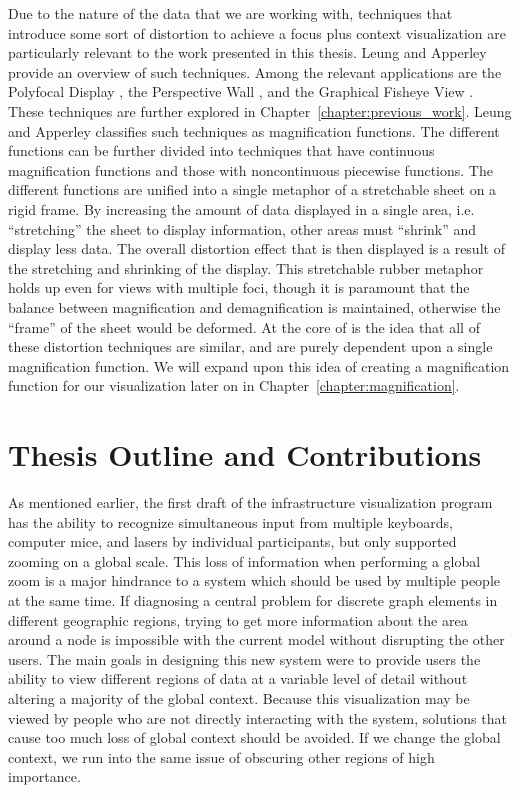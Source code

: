 Due to the nature of the data that we are working with, techniques that introduce some sort of distortion to achieve a focus plus context visualization are particularly relevant to the work presented in this thesis. Leung and Apperley provide an overview of such techniques\cite{Leung1994}. Among the relevant applications are the Polyfocal Display \cite{Kadmon1978}, the Perspective Wall \cite{Mackinlay1991}, and the Graphical Fisheye View \cite{Sarkar1992}. These techniques are further explored in
Chapter~\ref{chapter:previous_work}. Leung and Apperley classifies such techniques as magnification functions. The different functions can be further divided into techniques that have continuous magnification functions and those with noncontinuous piecewise functions. The different functions are unified into a single metaphor of a stretchable sheet on a rigid frame. By increasing the amount of data displayed in a single area, i.e. ``stretching'' the sheet to display information, other areas must ``shrink'' and display less data. The overall distortion effect that is then displayed is a result of the stretching and shrinking of the display.
This stretchable rubber metaphor holds up even for views with multiple foci, though it is paramount that the balance between magnification and demagnification is maintained, otherwise the ``frame'' of the sheet would be deformed. At the core of \cite{Leung1994} is the idea that all of these distortion techniques are similar, and are purely dependent upon a single magnification function. We will expand upon this idea of creating a magnification function for our visualization later on in Chapter~\ref{chapter:magnification}.

\section{Thesis Outline and Contributions}
\label{section:intro_outline}
As mentioned earlier, the first draft of the infrastructure visualization program has the ability to
recognize simultaneous input from multiple keyboards, computer mice, and lasers by individual participants, but only supported zooming on a global scale. This loss of information when performing a global zoom is a major hindrance to a system which should be used by multiple people at the same time. If diagnosing a central problem for discrete graph elements in different geographic regions, trying to get more information about the area around a node is impossible with the
current model without disrupting the other users. The main goals in designing this new system were to provide users the ability to view different regions of data at a variable level of detail without altering a majority of the
global context. Because this visualization may be viewed by people who are not directly interacting with the system, solutions that cause too much loss of global context should be avoided. If we change the global context, we run into the same issue of obscuring other regions of high importance. 


